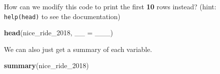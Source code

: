 \documentclass[]{book}
\newenvironment{Shaded}{\begin{snugshade}}{\end{snugshade}}
\newcommand{\KeywordTok}[1]{\textcolor[rgb]{0.13,0.29,0.53}{\textbf{#1}}}
\newcommand{\DataTypeTok}[1]{\textcolor[rgb]{0.13,0.29,0.53}{#1}}
\newcommand{\DecValTok}[1]{\textcolor[rgb]{0.00,0.00,0.81}{#1}}
\newcommand{\NormalTok}[1]{#1}
\begin{document}
How can we modify this code to print the first \textbf{10} rows instead?
(hint: \texttt{help(head)} to see the documentation)

\begin{Shaded}
\begin{Highlighting}[]
\KeywordTok{head}\NormalTok{(nice_ride_}\DecValTok{2018}\NormalTok{, }\DataTypeTok{__ =}\NormalTok{ ___)}
\end{Highlighting}
\end{Shaded}

We can also just get a summary of each variable.

\begin{Shaded}
\begin{Highlighting}[]
\KeywordTok{summary}\NormalTok{(nice_ride_}\DecValTok{2018}\NormalTok{)}
\end{Highlighting}
\end{Shaded}
\end{document}
